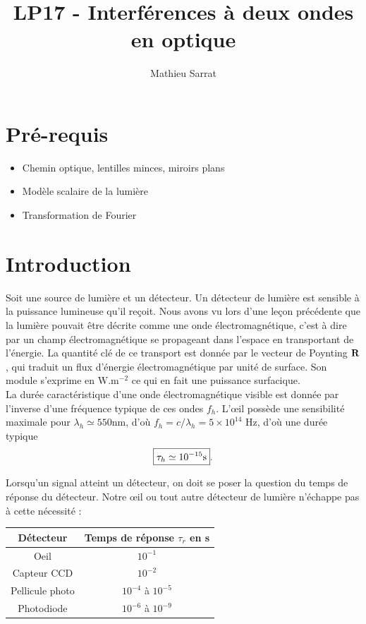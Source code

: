 \documentclass[11pt,a4paper]{report}
\author{Mathieu Sarrat}
\title{LP17 - Interférences à deux ondes en optique}
\begin{document}
\maketitle

\section*{Pré-requis}
\begin{itemize}
	\item Chemin optique, lentilles minces, miroirs plans
	\item Modèle scalaire de la lumière
	\item Transformation de Fourier
\end{itemize}

\newpage
\section*{Introduction}

Soit une source de lumière et un détecteur. Un détecteur de lumière est sensible à la puissance lumineuse qu'il reçoit. Nous avons vu lors d'une leçon précédente que la lumière pouvait être décrite comme une onde électromagnétique, c'est à dire par un champ électromagnétique se propageant dans l'espace en transportant de l'énergie. La quantité clé de ce transport est donnée par le vecteur de Poynting $\bold{R}$, qui traduit un flux d'énergie électromagnétique par unité de surface. Son module s'exprime en $\text{W}.\text{m}^{-2}$ ce qui en fait une puissance surfacique.\\

La durée caractéristique d'une onde électromagnétique visible est donnée par l'inverse d'une fréquence typique de ces ondes $f_h$. L'œil possède une sensibilité maximale pour $\lambda_h \simeq 550 \text{nm}$, d'où $f_h = c/\lambda_h = 5\times10^{14}$ Hz, d'où une durée typique
\begin{equation}
	\boxed{\tau_h \simeq 10^{-15}\text{s}}.\\
\end{equation}

Lorsqu'un signal atteint un détecteur, on doit se poser la question du temps de réponse du détecteur. Notre œil ou tout autre détecteur de lumière n'échappe pas à cette nécessité :

\begin{center}
\begin{tabular}{|c|c|}
  \hline
  	\textbf{Détecteur} & \textbf{Temps de réponse} $\tau_r$ en s\\
  \hline
  \hline
  	Oeil & $10^{-1}$\\
  \hline 
  	Capteur CCD & $10^{-2}$\\
  \hline
  	Pellicule photo & $10^{-4}$ à $10^{-5}$\\
  \hline
   	Photodiode & $10^{-6}$ à $10^{-9}$\\
  \hline
\end{tabular}
\end{center}
\end{document}

